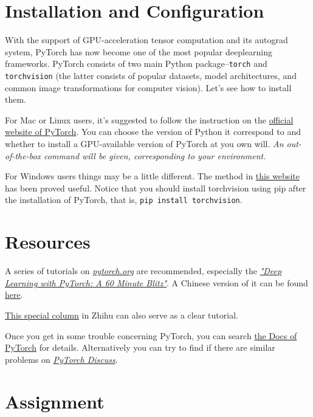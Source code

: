 \documentclass[english]{../TeXTemplate/pkupaper}
\title{\titlemark}
\author{Jason Jia\and Narsil Zhang}
\date{Updated on March 26}
\begin{document}
\maketitle
\section{Installation and Configuration}

With the support of GPU-acceleration tensor computation and its autograd system, PyTorch has now become one of the most popular deeplearning frameworks. PyTorch consists of two main Python package--\verb"torch" and \verb"torchvision" (the latter consists of popular datasets, model architectures, and common image transformations for computer vision). Let's see how to install them.

For Mac or Linux users, it's suggested to follow the instruction on the \href{http://pytorch.org}{official website of PyTorch}. You can choose the version of Python it correspond to and whether to install a GPU-available version of PyTorch at you own will. \emph{An out-of-the-box command will be given, corresponding to your environment.}

For Windows users things may be a little different. The method in \href{https://zhuanlan.zhihu.com/p/26871672}{this website} has been proved useful. Notice that you should install torchvision using pip after the installation of PyTorch, that is, \verb"pip install torchvision".

\section{Resources}

A series of tutorials on \href{http://pytorch.org}{\emph{pytorch.org}} are recommended, especially the \href{http://pytorch.org/tutorials/beginner/deep_learning_60min_blitz.html}{\emph{"Deep Learning with PyTorch: A 60 Minute Blitz"}}. A Chinese version of it can be found \href{https://zhuanlan.zhihu.com/p/25572330}{here}.

\href{https://zhuanlan.zhihu.com/c_94953554}{This special column} in Zhihu can also serve as a clear tutorial.

Once you get in some trouble concerning PyTorch, you can search \href{http://pytorch.org/docs/master/index.html}{the Docs of PyTorch} for details. Alternatively you can try to find if there are similar problems on \href{https://discuss.pytorch.org/}{\emph{PyTorch Discuss}}. 

\section{Assignment}
\end{document}
